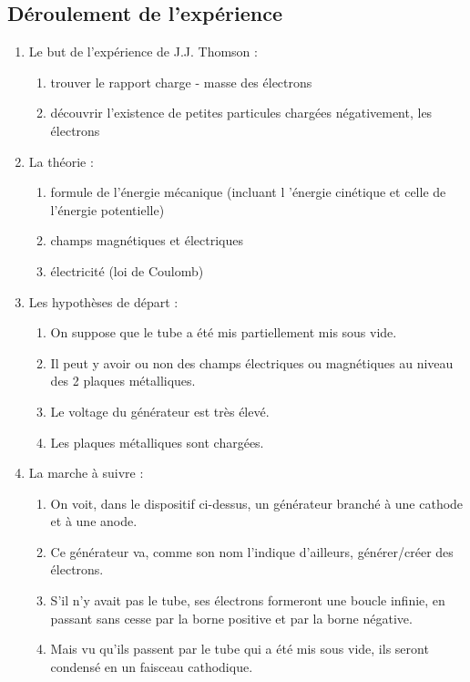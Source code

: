 \documentclass[../main.tex]{subfiles}
\begin{document}
\subsection{Déroulement de l'expérience}
\begin{enumerate}
    \item Le but de l'expérience de J.J. Thomson :
    \begin{enumerate}
        \item trouver le rapport charge - masse des électrons
        \item découvrir l'existence de petites particules chargées négativement, les électrons
    \end{enumerate}
    \item La théorie :
    \begin{enumerate}
        \item formule de l'énergie mécanique (incluant l 'énergie cinétique et celle de l'énergie potentielle)
        \item champs magnétiques et électriques
        \item électricité (loi de Coulomb) 
    \end{enumerate}
    \item Les hypothèses de départ :
    \begin{enumerate}
        \item On suppose que le tube a été mis partiellement mis sous vide.
        \item Il peut y avoir ou non des champs électriques ou magnétiques au niveau des 2 plaques métalliques.
        \item Le voltage du générateur est très élevé.
        \item Les plaques métalliques sont chargées.
    \end{enumerate}
    \item La marche à suivre :
    \begin{enumerate}
    \item On voit, dans le dispositif ci-dessus, un générateur branché à une cathode et à une anode.
    \item Ce générateur va, comme son nom l'indique d'ailleurs, générer/créer des électrons.
    \item S'il n'y avait pas le tube, ses électrons formeront une boucle infinie, en passant sans cesse par la borne positive et par la borne négative. 
    \item Mais vu qu'ils passent par le tube qui a été mis sous vide, ils seront condensé en un faisceau cathodique. 

\end{enumerate}
\end{enumerate}
\end{document}
